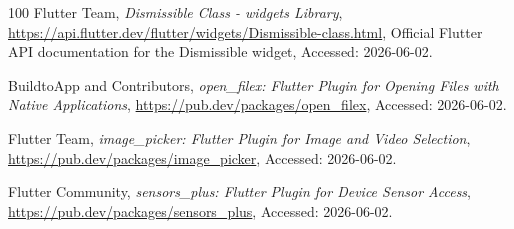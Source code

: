 \begin{thebibliography}{100}
Flutter Team,
\textit{Dismissible Class - widgets Library},
\url{https://api.flutter.dev/flutter/widgets/Dismissible-class.html},
Official Flutter API documentation for the Dismissible widget,
Accessed: 2026-06-02.

BuildtoApp and Contributors,
\textit{open\_filex: Flutter Plugin for Opening Files with Native Applications},
\url{https://pub.dev/packages/open_filex},
Accessed: 2026-06-02.

Flutter Team,
\textit{image\_picker: Flutter Plugin for Image and Video Selection},
\url{https://pub.dev/packages/image_picker},
Accessed: 2026-06-02.

Flutter Community,
\textit{sensors\_plus: Flutter Plugin for Device Sensor Access},
\url{https://pub.dev/packages/sensors_plus},
Accessed: 2026-06-02.

\end{thebibliography}
